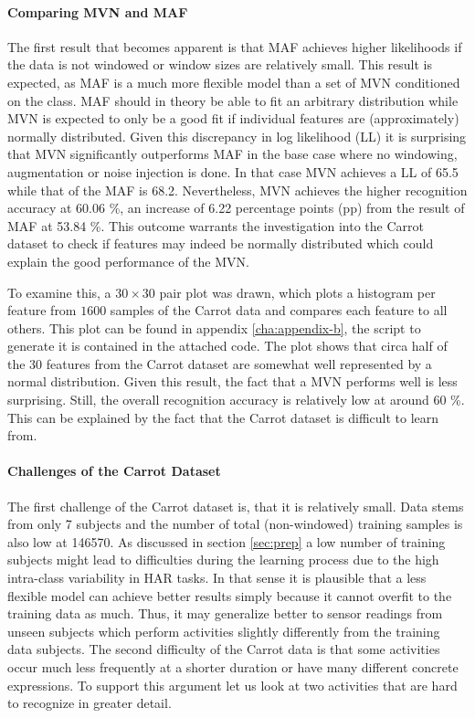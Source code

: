 \documentclass[11pt,titlepage,oneside,openany]{book}
\begin{document}
\paragraph{Comparing MVN and MAF}
\noindent The first result that becomes apparent is that MAF achieves higher likelihoods if the data is not windowed or window sizes are relatively small. This result is expected, as MAF is a much more flexible model than a set of MVN conditioned on the class. MAF should in theory be able to fit an arbitrary distribution while MVN is expected to only be a good fit if individual features are (approximately) normally distributed. Given this discrepancy in log likelihood (LL) it is surprising that MVN significantly outperforms MAF in the base case where no windowing, augmentation or noise injection is done. In that case MVN achieves a LL of 65.5 while that of the MAF is 68.2. Nevertheless, MVN achieves the higher recognition accuracy at 60.06 \%, an increase of 6.22 percentage points (pp) from the result of MAF at 53.84 \%. This outcome warrants the investigation into the Carrot dataset to check if features may indeed be normally distributed which could explain the good performance of the MVN.

To examine this, a $30 \times 30$ pair plot was drawn, which plots a histogram per feature from $1600$ samples of the Carrot data and compares each feature to all others. This plot can be found in appendix \ref{cha:appendix-b}, the script to generate it is contained in the attached code. The plot shows that circa half of the 30 features from the Carrot dataset are somewhat well represented by a normal distribution. Given this result, the fact that a MVN performs well is less surprising. Still, the overall recognition accuracy is relatively low at around 60 \%. This can be explained by the fact that the Carrot dataset is difficult to learn from.

\paragraph{Challenges of the Carrot Dataset}
The first challenge of the Carrot dataset is, that it is relatively small. Data stems from only 7 subjects and the number of total (non-windowed) training samples is also low at 146570. As discussed in section \ref{sec:prep} a low number of training subjects might lead to difficulties during the learning process due to the high intra-class variability in HAR tasks. In that sense it is plausible that a less flexible model can achieve better results simply because it cannot overfit to the training data as much. Thus, it may generalize better to sensor readings from unseen subjects which perform activities slightly differently from the training data subjects. The second difficulty of the Carrot data is that some activities occur much less frequently at a shorter duration or have many different concrete expressions. To support this argument let us look at two activities that are hard to recognize in greater detail.
\end{document}

